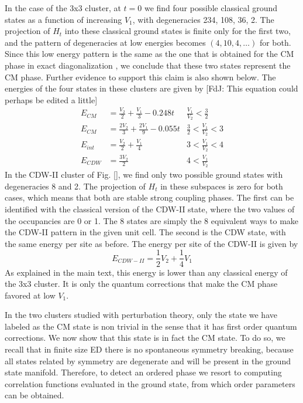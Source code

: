 \documentclass[aps,prx,10pt,twocolumn,floatfix,superscriptaddress,showpacs,numerical,footinbib]{revtex4-1}
\newcommand{\noteFdJ}[1]{{\color{cyan} [FdJ: #1]}}
\begin{document}
In the case of the 3x3 cluster, at $t=0$ we find four possible classical ground states as a function of increasing $V_1$, with degeneracies 234, 108, 36, 2.
%
The projection of $H_t$ into these classical ground states is finite only for the first two, and the pattern of degeneracies at low energies becomes $(4,10,4,\ldots)$ for both.
%
Since this low energy pattern is the same as the one that is obtained for the CM phase in exact diagonalization \cite{Noel}, we conclude that these two states represent the CM phase.
%
Further evidence to support this claim is also shown below. 
%
The energies of the four states in these clusters are given by \noteFdJ{This equation could perhaps be edited a little}
%
\begin{align}
E_{CM} &= \frac{V_2}{2} + \frac{V_1}{3} -0.248t & \tfrac{V_1}{V_2} < \tfrac{3}{2}\\
E_{CM} &= \frac{2V_2}{3} + \frac{2V_1}{9} -0.055t  & \tfrac{3}{2} <\tfrac{V_1}{V_2} < 3\\
E_{int} &= \frac{V_2}{2} + \frac{V_1}{4} & 3 <\tfrac{V_1}{V_2} < 4\\
E_{CDW} &= \frac{3V_2}{2}   &  4 < \tfrac{V_1}{V_2}
\end{align}
%
In the CDW-II cluster of Fig. \ref{}, we find only two possible ground states with degeneracies 8 and 2.
% 
The projection of $H_t$ in these subspaces is zero for both cases, which means that both are stable strong coupling phases.
%
The first can be identified with the classical version of the CDW-II state, where the two values of the occupancies are 0 or 1.
%
The 8 states are simply the 8 equivalent ways to make the CDW-II pattern in the given unit cell. 
The second is the CDW state, with the same energy per site as before. The energy per site of the CDW-II is given by
%
\begin{equation}
E_{CDW-II} = \frac{1}{2}V_2 + \frac{1}{4}V_1
\end{equation}
%
As explained in the main text, this energy is lower than any classical energy of the 3x3 cluster. It is only the quantum corrections that make the CM phase favored at low $V_1$. 

%
In the two clusters studied with perturbation theory, only the state we have labeled as the CM state is non trivial in the sense that it has first order quantum corrections.
%
We now show that this state is in fact the CM state. 
%
To do so, we recall that in finite size ED there is no spontaneous symmetry breaking, because all states related by symmetry are degenerate and will be present in the ground state manifold.
%
Therefore, to detect an ordered phase we resort to computing correlation functions evaluated in the ground state, from which order parameters can be obtained. 
%
 
\end{document}
